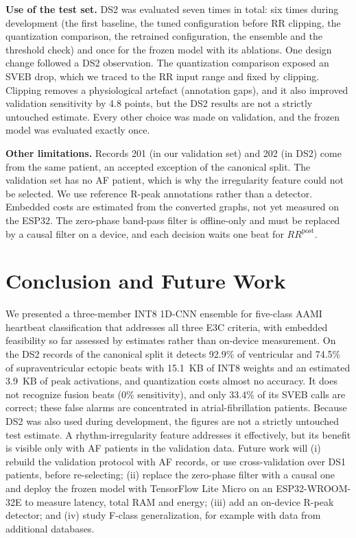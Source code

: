 \documentclass[conference]{IEEEtran}
\begin{document}
\textbf{Use of the test set.} DS2 was evaluated seven times in total: six times during development (the first baseline, the tuned configuration before RR clipping, the quantization comparison, the retrained configuration, the ensemble and the threshold check) and once for the frozen model with its ablations. One design change followed a DS2 observation. The quantization comparison exposed an SVEB drop, which we traced to the RR input range and fixed by clipping. Clipping removes a physiological artefact (annotation gaps), and it also improved validation sensitivity by 4.8 points, but the DS2 results are not a strictly untouched estimate. Every other choice was made on validation, and the frozen model was evaluated exactly once.

\textbf{Other limitations.} Records 201 (in our validation set) and 202 (in DS2) come from the same patient, an accepted exception of the canonical split. The validation set has no AF patient, which is why the irregularity feature could not be selected. We use reference R-peak annotations rather than a detector. Embedded costs are estimated from the converted graphs, not yet measured on the ESP32. The zero-phase band-pass filter is offline-only and must be replaced by a causal filter on a device, and each decision waits one beat for $RR^{\mathrm{post}}$.

\section{Conclusion and Future Work}
We presented a three-member INT8 1D-CNN ensemble for five-class AAMI heartbeat classification that addresses all three E3C criteria, with embedded feasibility so far assessed by estimates rather than on-device measurement. On the DS2 records of the canonical split it detects 92.9\% of ventricular and 74.5\% of supraventricular ectopic beats with 15.1~KB of INT8 weights and an estimated 3.9~KB of peak activations, and quantization costs almost no accuracy. It does not recognize fusion beats (0\% sensitivity), and only 33.4\% of its SVEB calls are correct; these false alarms are concentrated in atrial-fibrillation patients. Because DS2 was also used during development, the figures are not a strictly untouched test estimate. A rhythm-irregularity feature addresses it effectively, but its benefit is visible only with AF patients in the validation data. Future work will (i) rebuild the validation protocol with AF records, or use cross-validation over DS1 patients, before re-selecting; (ii) replace the zero-phase filter with a causal one and deploy the frozen model with TensorFlow Lite Micro on an ESP32-WROOM-32E to measure latency, total RAM and energy; (iii) add an on-device R-peak detector; and (iv) study F-class generalization, for example with data from additional databases.



\end{document}
